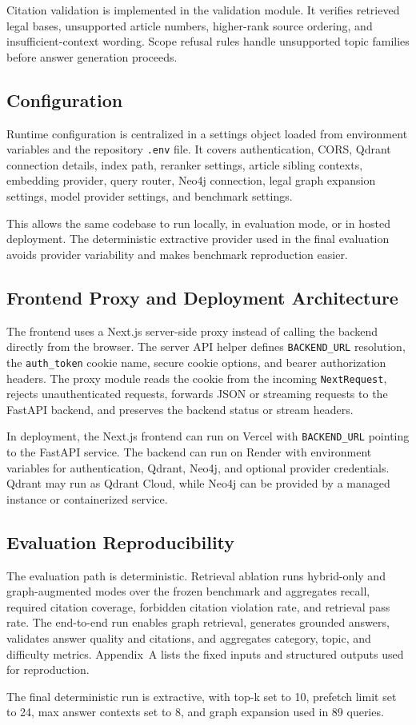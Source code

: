 Citation validation is implemented in the validation module. It verifies retrieved legal bases, unsupported article numbers, higher-rank source ordering, and insufficient-context wording. Scope refusal rules handle unsupported topic families before answer generation proceeds.

\subsection{Configuration}
Runtime configuration is centralized in a settings object loaded from environment variables and the repository \texttt{.env} file. It covers authentication, CORS, Qdrant connection details, index path, reranker settings, article sibling contexts, embedding provider, query router, Neo4j connection, legal graph expansion settings, model provider settings, and benchmark settings.

This allows the same codebase to run locally, in evaluation mode, or in hosted deployment. The deterministic extractive provider used in the final evaluation avoids provider variability and makes benchmark reproduction easier.

\subsection{Frontend Proxy and Deployment Architecture}
The frontend uses a Next.js server-side proxy instead of calling the backend directly from the browser. The server API helper defines \texttt{BACKEND\_URL} resolution, the \texttt{auth\_token} cookie name, secure cookie options, and bearer authorization headers. The proxy module reads the cookie from the incoming \texttt{NextRequest}, rejects unauthenticated requests, forwards JSON or streaming requests to the FastAPI backend, and preserves the backend status or stream headers.

In deployment, the Next.js frontend can run on Vercel with \texttt{BACKEND\_URL} pointing to the FastAPI service. The backend can run on Render with environment variables for authentication, Qdrant, Neo4j, and optional provider credentials. Qdrant may run as Qdrant Cloud, while Neo4j can be provided by a managed instance or containerized service.


\subsection{Evaluation Reproducibility}
The evaluation path is deterministic. Retrieval ablation runs hybrid-only and graph-augmented modes over the frozen benchmark and aggregates recall, required citation coverage, forbidden citation violation rate, and retrieval pass rate. The end-to-end run enables graph retrieval, generates grounded answers, validates answer quality and citations, and aggregates category, topic, and difficulty metrics. Appendix~A lists the fixed inputs and structured outputs used for reproduction.

The final deterministic run is extractive, with top-k set to 10, prefetch limit set to 24, max answer contexts set to 8, and graph expansion used in 89 queries.

